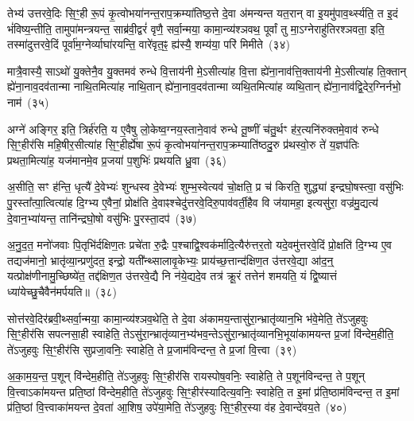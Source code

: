 {\anuvakamend[{यात॒वै ह॑वि॒र्धान॑ञ्च प॒शून्पा॒प्मना॒\-ऽष्टाद॑श च}]}%

तेभ्य॑ उत्तरवे॒दिः सि॒ꣳ॒ही रू॒पं कृ॒त्वोभया॑नन्त॒राप॒क्रम्या॑तिष्ठ॒त्ते दे॒वा अ॑मन्यन्त यत॒रान् वा इ॒यमु॑पाव॒र्थ्स्यति॒ त इ॒दं भं॑विष्य॒न्तीति॒ तामुपा॑मन्त्रयन्त॒ साब्र॑वी॒द्वरं॑ वृणै॒ सर्वा॒न्मया॒ कामा॒न्व्य॑श्ञवथ॒ पूर्वां तु मा॒\-ऽग्नेराहु॑तिरश्ञवता॒ इति॒ तस्मा॑दुत्तरवे॒दिं पूर्वा॑म॒ग्नेर्व्याघा॑रयन्ति॒ वारे॑वृत॒ꣴ॒ ह्य॑स्यै॒ शम्य॑या॒ परि॑ मिमीते~(३४)

मात्रै॒वास्यै॒ सा\-ऽथो॑ यु॒क्तेनै॒व यु॒क्तमव॑ रुन्धे वि॒त्ताय॑नी मे॒\-ऽसीत्या॑ह वि॒त्ता ह्ये॑ना॒नाव॑त्ति॒क्ताय॑नी मे॒\-ऽसीत्या॑ह ति॒क्तान् ह्ये॑ना॒नाव॒दव॑तान्मा नाथि॒तमित्या॑ह नाथि॒तान् ह्ये॑ना॒नाव॒दव॑तान्मा व्यथि॒तमित्या॑ह व्यथि॒तान् ह्ये॑ना॒नाव॑द्वि॒देर॒ग्निर्नभो॒ नाम॑~(३५)

अग्ने॑ अङ्गिर॒ इति॒ त्रिर्\mbox{}ह॑रति॒ य ए॒वैषु लो॒केष्व॒ग्नय॒स्ताने॒वाव॑ रुन्धे तू॒ष्णीं च॑तु॒र्थꣳ ह॑र॒त्यनि॑रुक्तमे॒वाव॑ रुन्धे सि॒ꣳ॒हीर॑सि महि॒षीर॒सीत्या॑ह सि॒ꣳ॒हीर्\mbox{}ह्ये॑षा रू॒पं कृ॒त्वोभया॑नन्त॒राप॒क्रम्याति॑ष्ठदु॒रु प्र॑थस्वो॒रु ते॑ य॒ज्ञप॑तिः प्रथता॒मित्या॑ह॒ यज॑मानमे॒व प्र॒जया॑ प॒शुभिः॑ प्रथयति ध्रु॒वा~(३६)

अ॒सीति॒ सꣳ ह॑न्ति॒ धृत्यै॑ दे॒वेभ्यः॑ शुन्धस्व दे॒वेभ्यः॑ शुम्भ॒स्वेत्यव॑ चो॒क्षति॒ प्र च॑ किरति॒ शुद्ध्या॑ इन्द्रघो॒षस्त्वा॒ वसु॑भिः पु॒रस्ता᳚त्पा॒त्वित्या॑ह दि॒ग्भ्य ए॒वैनां॒ प्रोक्ष॑ति दे॒वाꣴश्चेदु॑त्तरवे॒दिरु॒पाव॑वर्ती॒हैव वि ज॑यामहा॒ इत्यसु॑रा॒ वज्र॑मु॒द्यत्य॑ दे॒वान॒भ्या॑यन्त॒ तानि॑न्द्रघो॒षो वसु॑भिः पु॒रस्ता॒दप॑~(३७)

अ॒नु॒द॒त॒ मनो॑जवाः पि॒तृभि॑र्दक्षिण॒तः प्रचे॑ता रु॒द्रैः प॒श्चाद्वि॒श्वक॑र्मादि॒त्यैरु॑त्तर॒तो यदे॒वमु॑त्तरवे॒दिं प्रो॒क्षति॑ दि॒ग्भ्य ए॒व तद्यज॑मानो॒ भ्रातृ॑व्या॒न्प्रणु॑दत॒ इन्द्रो॒ यती᳚न्थ्सालावृ॒केभ्यः॒ प्राय॑च्छ॒त्तान्द॑क्षिण॒त उ॑त्तरवे॒द्या आ॑द॒न्॒ यत्प्रोक्ष॑णीनामु॒च्छिष्ये॑त॒ तद्द॑क्षिण॒त उ॑त्तरवे॒द्यै नि न॑ये॒द्यदे॒व तत्र॑ क्रू॒रं तत्तेन॑ शमयति॒ यं द्वि॒ष्यात्तं ध्या॑येच्छु॒चैवैन॑मर्पयति॥~(३८)

{\anuvakamend[{मि॒मी॒ते॒ नाम॑ ध्रु॒वा\-ऽप॑ शु॒चा त्रीणि॑ च}]}%

सोत्त॑रवे॒दिर॑ब्रवी॒थ्सर्वा॒न्मया॒ कामा॒न्व्य॑श्ञव॒थेति॒ ते दे॒वा अ॑कामय॒न्तासु॑रा॒न्भ्रातृ॑व्यान॒भि भ॑वे॒मेति॒ ते॑\-ऽजुहवुः सि॒ꣳ॒हीर॑सि सपत्नसा॒ही स्वाहेति॒ ते\-ऽसु॑रा॒न्भ्रातृ॑व्यान॒भ्य॑भव॒न्ते\-ऽसु॑रा॒न्भ्रातृ॑व्यानभि॒भूया॑कामयन्त प्र॒जां वि॑न्देम॒हीति॒ ते॑\-ऽजुहवुः सि॒ꣳ॒हीर॑सि सुप्रजा॒वनिः॒ स्वाहेति॒ ते प्र॒जाम॑विन्दन्त॒ ते प्र॒जां वि॒त्त्वा~(३९)

अ॒का॒म॒य॒न्त॒ प॒शून् वि॑न्देम॒हीति॒ ते॑\-ऽजुहवुः सि॒ꣳ॒हीर॑सि रायस्पोष॒वनिः॒ स्वाहेति॒ ते प॒शून॑विन्दन्त॒ ते प॒शून् वि॒त्त्वा\-ऽका॑मयन्त प्रति॒ष्ठां वि॑न्देम॒हीति॒ ते॑\-ऽजुहवुः सि॒ꣳ॒हीर॑स्यादित्य॒वनिः॒ स्वाहेति॒ त इ॒मां प्र॑ति॒ष्ठाम॑विन्दन्त॒ त इ॒मां प्र॑ति॒ष्ठां वि॒त्त्वाका॑मयन्त दे॒वता॑ आ॒शिष॒ उपे॑या॒मेति॒ ते॑\-ऽजुहवुः सि॒ꣳ॒हीर॒स्या व॑ह दे॒वान्दे॑वय॒ते~(४०)

